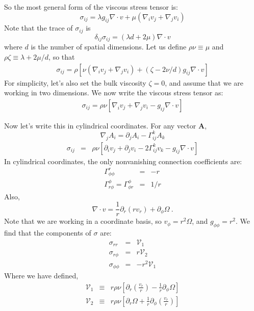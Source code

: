 \documentclass{article}
\begin{document}
So the most general form of the viscous stress tensor is:
\begin{equation*}
  \sigma_{ij} = \lambda g_{ij}\nabla \cdot v + \mu(\nabla_iv_j + \nabla_j v_i)
\end{equation*}
Note that the trace of $\sigma_{ij}$ is
\begin{equation*}
  \delta_{ij}\sigma_{ij} = (\lambda d + 2 \mu)\nabla \cdot v
\end{equation*}
where $d$ is the number of spatial dimensions. Let us define $\rho \nu \equiv \mu$ and $\rho \zeta \equiv \lambda  + 2 \mu/d$, so that
\begin{eqnarray*}
  \sigma_{ij} = \rho\left[
  \nu(\nabla_iv_j + \nabla_j v_i) +(\zeta-2\nu/d) g_{ij}\nabla \cdot v
  \right]
\end{eqnarray*}
For simplicity, let's also set the bulk viscosity $\zeta=0$, and assume that we are working in two dimensions. We now write the viscous stress tensor as:
\begin{eqnarray}
  \boxed{\sigma_{ij} = \rho \nu \left[
      \nabla_iv_j + \nabla_j v_i - g_{ij}\nabla \cdot v
  \right]}
\end{eqnarray}

Now let's write this in cylindrical coordinates. For any vector $\mathbf{A}$,
\begin{equation*}
  \nabla_j A_i = \partial_j A_i - \Gamma^k_{ij}A_k
\end{equation*}
\begin{eqnarray*}
  \sigma_{ij} &=& \rho \nu \left[
  \partial_iv_j + \partial_j v_i - 2\Gamma^k_{ij}v_k - g_{ij}\nabla \cdot v
  \right]
\end{eqnarray*}
In cylindrical coordinates, the only nonvanishing connection coefficients are:
\begin{eqnarray*}
  \Gamma^r_{\phi\phi}&=&-r\\
  \Gamma^{\phi}_{r\phi}=\Gamma^{\phi}_{\phi r} &=&1/r 
\end{eqnarray*}
Also,
\begin{equation*}
  \nabla \cdot v = \frac{1}{r}\partial_r(r v_r) + \partial_{\phi} \Omega \ .
\end{equation*}
Note that we are working in a coordinate basis, so $v_{\phi} = r^2 \Omega$, and $g_{\phi \phi} = r^2$. We find that the components of $\sigma$ are:
\begin{eqnarray*}
  \sigma_{rr} &=& \mathcal{V}_1\\
\sigma_{r\phi} &=& r\mathcal{V}_2\\
\sigma_{\phi \phi} &=& -r^2\mathcal{V}_1
\end{eqnarray*}
Where we have defined,
\begin{eqnarray*}
  \mathcal{V}_1 &\equiv& r \rho \nu \left[ \partial_r \left(\frac{v_r}{r}\right) - \frac{1}{r}\partial_{\phi} \Omega \right]\\
  \mathcal{V}_2 &\equiv& r \rho \nu \left[ \partial_r \Omega + \frac{1}{r}\partial_{\phi} \left(\frac{v_r}{r}\right) \right]
\end{eqnarray*}
\end{document}
